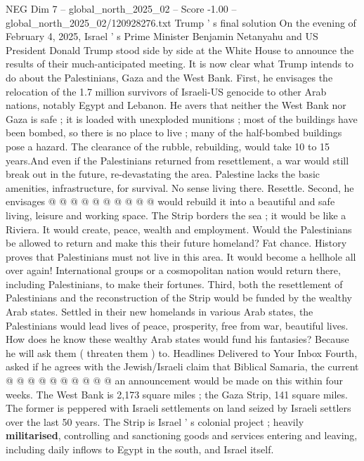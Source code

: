 \begin{textsample}{NEG Dim 7 – global\_north\_2025\_02 – Score -1.00 – global\_north\_2025\_02/120928276.txt}  \label{ex:f7_neg_173}
Trump ' s final solution On the evening of February 4, 2025, Israel ' s Prime Minister Benjamin Netanyahu and US President Donald Trump stood side by side at the White House to announce the results of their much-anticipated meeting.
It is now clear what Trump intends to do about the Palestinians, Gaza and the West Bank.
First, he envisages the relocation of the 1.7 million survivors of Israeli-US genocide to other Arab nations, notably Egypt and Lebanon.
He avers that neither the West Bank nor Gaza is safe ; it is loaded with unexploded munitions ; most of the buildings have been bombed, so there is no place to live ; many of the half-bombed buildings pose a hazard.
The clearance of the rubble, rebuilding, would take 10 to 15 years.And even if the Palestinians returned from resettlement, a war would still break out in the future, re-devastating the area.
Palestine lacks the basic amenities, infrastructure, for survival.
No sense living there.
Resettle.
Second, he envisages @ @ @ @ @ @ @ @ @ @ would rebuild it into a beautiful and safe living, leisure and working space.
The Strip borders the sea ; it would be like a Riviera.
It would create, peace, wealth and employment.
Would the Palestinians be allowed to return and make this their future homeland?
Fat chance.
History proves that Palestinians must not live in this area.
It would become a hellhole all over again!
International groups or a cosmopolitan nation would return there, including Palestinians, to make their fortunes.
Third, both the resettlement of Palestinians and the reconstruction of the Strip would be funded by the wealthy Arab states.
Settled in their new homelands in various Arab states, the Palestinians would lead lives of peace, prosperity, free from war, beautiful lives.
How does he know these wealthy Arab states would fund his fantasies?
Because he will ask them ( threaten them ) to.
Headlines Delivered to Your Inbox Fourth, asked if he agrees with the Jewish/Israeli claim that Biblical Samaria, the current @ @ @ @ @ @ @ @ @ @ an announcement would be made on this within four weeks.
The West Bank is 2,173 square miles ; the Gaza Strip, 141 square miles.
The former is peppered with Israeli settlements on land seized by Israeli settlers over the last 50 years.
The Strip is Israel ' s colonial project ; heavily \textbf{militarised}, controlling and sanctioning goods and services entering and leaving, including daily inflows to Egypt in the south, and Israel itself.

\end{textsample}
